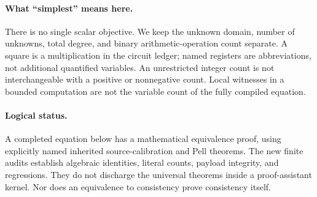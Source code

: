 \documentclass[11pt]{article}
\begin{document}
\paragraph{What ``simplest'' means here.}
There is no single scalar objective. We keep the unknown domain, number
of unknowns, total degree, and binary arithmetic-operation count separate.
A square is a multiplication in the circuit ledger; named registers are
abbreviations, not additional quantified variables. An unrestricted
integer count is not interchangeable with a positive or nonnegative
count. Local witnesses in a bounded computation are not the variable
count of the fully compiled equation.

\paragraph{Logical status.}
A completed equation below has a mathematical equivalence proof, using
explicitly named inherited source-calibration and Pell theorems. The
new finite audits establish algebraic identities, literal counts, payload
integrity, and regressions. They do not discharge the universal theorems
inside a proof-assistant kernel. Nor does an equivalence to consistency
prove consistency itself.




\newcommand{\FreeCMainDegree}{1\,576\,864}
\newcommand{\FreeCMainOps}{481}
\newcommand{\FreeCParameterDegree}{16\,424}







\end{document}

